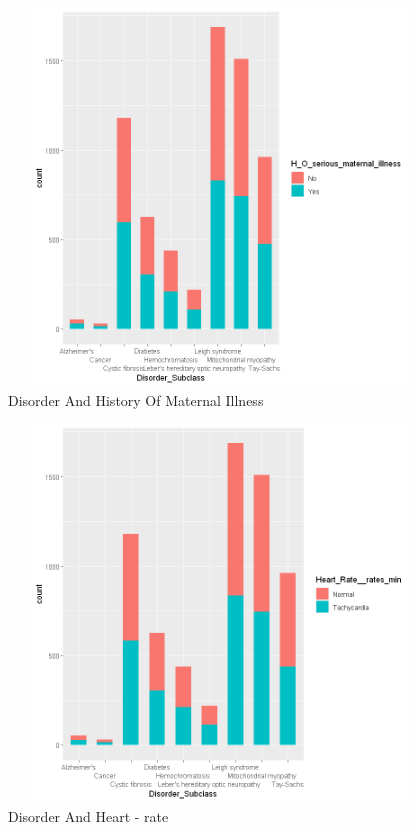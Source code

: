 \begin{figure}[htpb]
	\centering
	\includegraphics[height=10cm, width=12cm]{figures/maternalill.png}
	\caption{Disorder And History Of Maternal Illness}
	\label{fig 5}
\end{figure}

\begin{figure}[htpb]
	\centering
	\includegraphics[height=10cm, width=12cm]{figures/heartrate.png}
	\caption{Disorder And Heart - rate}
	\label{fig 6}
\end{figure}

